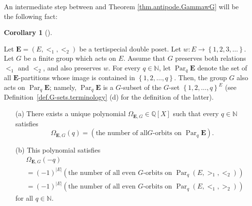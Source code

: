 \documentclass[numbers=enddot,12pt,final,onecolumn,notitlepage,abstracton]{scrartcl}%
\theoremstyle{definition}
\newtheorem{coro}[theo]{Corollary}
\newenvironment{corollary}[1][]
{\begin{coro}[#1]\begin{leftbar}}
{\end{leftbar}\end{coro}}
\newcommand{\Par}{\operatorname{Par}}
\newcommand{\EE}{{\mathbf{E}}}
\newcommand{\NN}{{\mathbb{N}}}
\begin{document}
An intermediate step between \cite[Theorem 2.13]{Joch} and Theorem
\ref{thm.antipode.GammawG} will be the following fact:

\begin{corollary}
\label{cor.reciprocity.GammawG}Let $ \EE =\left(  E,<_{1},<_{2}\right)
$ be a tertispecial double poset. Let $w:E\rightarrow\left\{  1,2,3,\ldots
\right\}  $. Let $G$ be a finite group which acts on $E$. Assume that $G$
preserves both relations $<_{1}$ and $<_{2}$, and also preserves $w$. For
every $q\in \NN $, let $\Par_q \EE$
denote the set of all $\EE$-partitions whose image is contained in
$\left\{  1,2,\ldots,q\right\}  $. Then, the group $G$ also acts on
$\Par_q \EE$; namely,
$\Par_q \EE$ is a $G$-subset of the $G$-set $\left\{  1,2,\ldots
,q\right\}  ^{E}$ (see Definition~\ref{def.G-sets.terminology} (d) for the
definition of the latter).

\begin{enumerate}
\item[(a)] There exists a unique polynomial $\Omega_{\EE, G}
\in\mathbb{Q}\left[  X\right]  $ such that every $q\in \NN $ satisfies%
\begin{equation}
\Omega_{\EE, G}\left(  q\right)  =\left(  \text{the number of all
}G\text{-orbits on } \Par_q \EE \right)  .
\label{eq.cor.reciprocity.GammawG.a.def}
\end{equation}


\item[(b)] This polynomial satisfies%
\begin{align}
&  \Omega_{\EE,G}\left(  -q\right) \nonumber\\
&  =\left(  -1\right)  ^{\left\vert E\right\vert }\left(  \text{the number of
all even }G\text{-orbits on } \Par_q \left(
E,>_{1},<_{2}\right)  \right) \nonumber\\
&  =\left(  -1\right)  ^{\left\vert E\right\vert }\left(  \text{the number of
all even }G\text{-orbits on } \Par_q \left(
E,<_{1},>_{2}\right)  \right)
\label{eq.cor.reciprocity.GammawG.b.2}
\end{align}
for all $q\in \NN $.
\end{enumerate}
\end{corollary}
\end{document}
